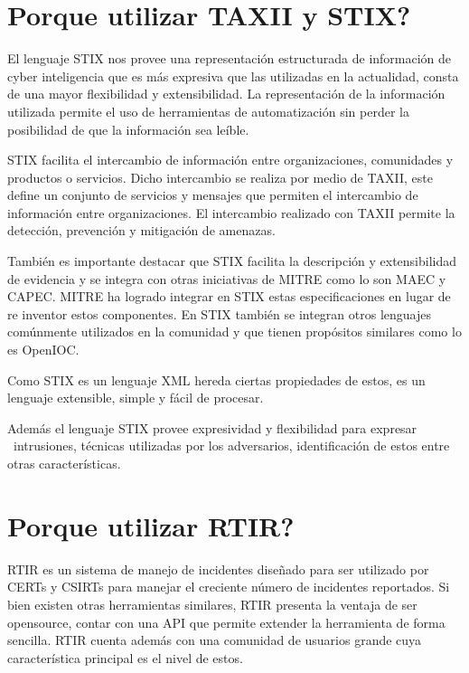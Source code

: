 \documentclass[11pt]{article}
\begin{document}
\section[Porque utilizar TAXII y STIX?]{Porque utilizar TAXII y STIX?}

\bigskip

El lenguaje STIX nos provee una representación estructurada de información de cyber inteligencia que es más expresiva que las utilizadas en la actualidad, consta de una mayor flexibilidad y extensibilidad. La representación de la información utilizada permite el uso de herramientas de automatización sin perder la posibilidad de que la información sea leíble.

STIX facilita el intercambio de información entre organizaciones, comunidades y productos o servicios. Dicho intercambio se realiza por medio de TAXII, este define un conjunto de servicios y mensajes que permiten el intercambio de información entre organizaciones. El intercambio realizado con TAXII permite la detección, prevención y mitigación de amenazas.


\bigskip

También es importante destacar que STIX facilita la descripción y extensibilidad de evidencia y se integra con otras iniciativas de MITRE como lo son MAEC y CAPEC. MITRE ha logrado integrar en STIX estas especificaciones en lugar de re inventor estos componentes. En STIX también se integran otros lenguajes comúnmente utilizados en la comunidad y que tienen propósitos similares como lo es OpenIOC.


\bigskip

Como STIX es un lenguaje XML hereda ciertas propiedades de estos, es un lenguaje extensible, simple y fácil de procesar. 


\bigskip

Además el lenguaje STIX provee expresividad y flexibilidad para expresar \ intrusiones, técnicas utilizadas por los adversarios, identificación de estos entre otras características.


\bigskip

\section[Porque utilizar RTIR?]{Porque utilizar RTIR?}
RTIR es un sistema de manejo de incidentes diseñado para ser utilizado por CERTs y CSIRTs para manejar el creciente número de incidentes reportados. Si bien existen otras herramientas similares, RTIR presenta la ventaja de ser opensource, contar con una API que permite extender la herramienta de forma sencilla. RTIR cuenta además con una comunidad de usuarios grande cuya característica principal es el nivel de estos.
\end{document}
